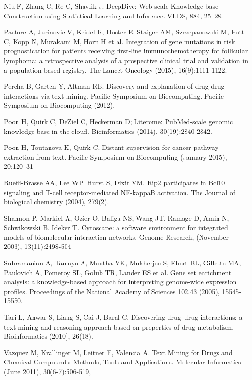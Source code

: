 \documentclass{ws-procs11x85}
\begin{document}
\begin{thebibliography}{10}
 Niu F, Zhang C, Re C, Shavlik J.  DeepDive: Web-scale Knowledge-base Construction using Statistical Learning and Inference. VLDS, 884, 25–28.

 Pastore A, Jurinovic V, Kridel R, Hoster E, Staiger AM, Szczepanowski M, Pott C, Kopp N, Murakami M, Horn H et al. Integration of gene mutations in risk prognostication for patients receiving first-line immunochemotherapy for follicular lymphoma: a retrospective analysis of a prospective clinical trial and validation in a population-based registry. The Lancet Oncology (2015), 16(9):1111-1122.

 Percha B, Garten Y, Altman RB. Discovery and explanation of drug-drug interactions via text mining. Pacific Symposium on Biocomputing. Pacific Symposium on Biocomputing (2012).%

 Poon H, Quirk C, DeZiel C, Heckerman D; Literome: PubMed-scale genomic knowledge base in the cloud. Bioinformatics (2014), 30(19):2840-2842. 

 Poon H, Toutanova K, Quirk C. Distant supervision for cancer pathway extraction from text. Pacific Symposium on Biocomputing (January 2015), 20:120–31.

 Ruefli-Brasse AA, Lee WP, Hurst S, Dixit VM. Rip2 participates in Bcl10 signaling and T-cell receptor-mediated NF-kappaB activation. The Journal of biological chemistry (2004), 279(2). %

 Shannon P, Markiel A, Ozier O, Baliga NS, Wang JT, Ramage D, Amin N, Schwikowski B, Ideker T. Cytoscape: a software environment for integrated models of biomolecular interaction networks. Genome Research, (November 2003), 13(11):2498-504

 Subramanian A, Tamayo A, Mootha VK, Mukherjee S, Ebert BL, Gillette MA, Paulovich A, Pomeroy SL, Golub TR, Lander ES et al. Gene set enrichment analysis: a knowledge-based approach for interpreting genome-wide expression profiles. Proceedings of the National Academy of Sciences 102.43 (2005), 15545-15550.

 Tari L, Anwar S, Liang S, Cai J, Baral C. Discovering drug–drug interactions: a text-mining and reasoning approach based on properties of drug metabolism.  Bioinformatics (2010), 26(18). %

 Vazquez M, Krallinger M, Leitner F, Valencia A. Text Mining for Drugs and Chemical Compounds: Methods, Tools and Applications. Molecular Informatics (June 2011), 30(6-7):506-519, 


\end{thebibliography}
\end{document}
